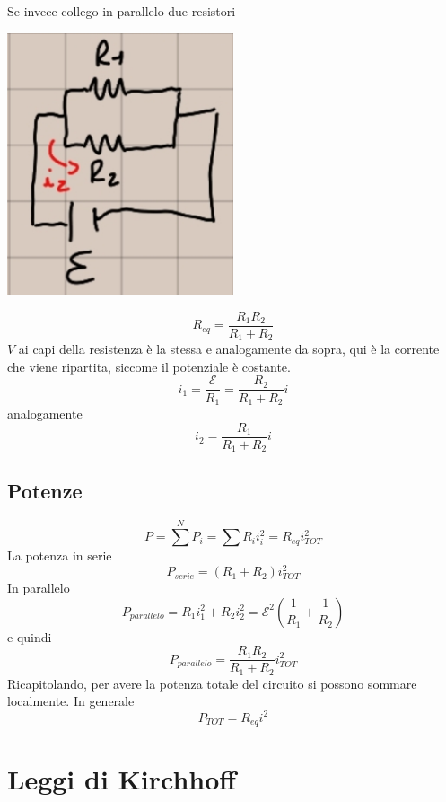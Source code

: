 \documentclass[a4paper, 12pt]{book}
\theoremstyle{plain}
\begin{document}
Se invece collego in parallelo due resistori 
\begin{center}
    \includegraphics[width=0.5\textwidth]{es_parall.jpg}
\end{center}
\[ R_{eq} = \frac{R_1R_2}{R_1 + R_2} \] 
$V$ ai capi della resistenza è la stessa e analogamente da 
sopra, qui è la corrente che viene ripartita, siccome il potenziale
è costante.
\[ i_1 = \frac{\mathcal{E}}{R_1} = \frac{R_2}{R_1 + R_2} i \] 
analogamente
\[ i_2 = \frac{R_1}{R_1 + R_2} i \]

\subsection{Potenze}

\[ P = \sum^N P_i = \sum R_i i_i^2 = R_{eq}i^2_{TOT} \]
La potenza in serie \[ P_{serie} = (R_1 + R_2) i^2_{TOT} \] 
In parallelo \[ P_{parallelo} = R_1 i_1^2 + R_2 i_2^2 = \mathcal{E}^2 (\frac{1}{R_1} + \frac{1}{R_2}) \] 
e quindi \[ P_{parallelo} = \frac{R_1 R_2}{R_1 + R_2} i^2_{TOT} \] 
Ricapitolando, per avere la potenza totale del circuito si 
possono sommare localmente. In generale \[ P_{TOT} = R_{eq} i^2 \]

\section{Leggi di Kirchhoff}
\end{document}

